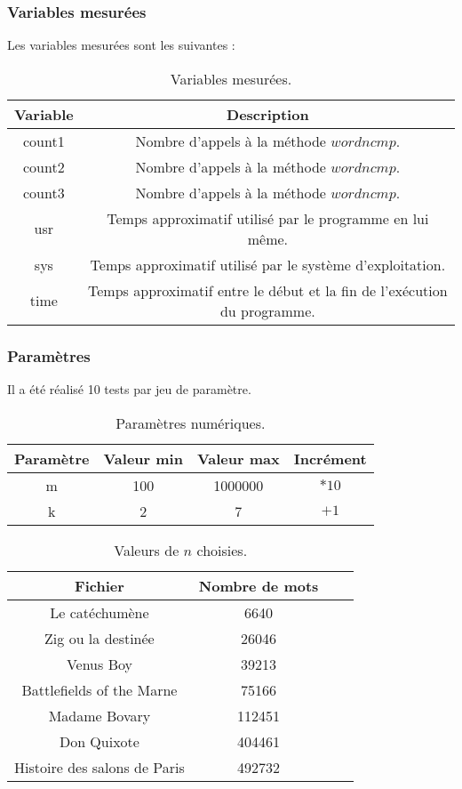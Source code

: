 \subsubsection{Variables mesurées}

Les variables mesurées sont les suivantes :

\begin{table}[h!]
	\centering
	\caption{Variables mesurées.}
	\label{tab:variablesMesureesExperience}
	\begin{tabular}{c|c}
		\toprule
		Variable & Description\\
		\midrule
		count1 & Nombre d'appels à la méthode $wordncmp$.\\
		count2 & Nombre d'appels à la méthode $wordncmp$.\\
		count3 & Nombre d'appels à la méthode $wordncmp$.\\
		usr & Temps approximatif utilisé par le programme en lui même.\\
		sys & Temps approximatif utilisé par le système d'exploitation.\\
		time & Temps approximatif entre le début et la fin de l'exécution du programme.\\
		\bottomrule
	\end{tabular}
\end{table}

\subsubsection{Paramètres}
Il a été réalisé 10 tests par jeu de paramètre.

\begin{table}[h!]
	\centering
	\caption{Paramètres numériques.}
	\label{tab:parametresNumeriquesRealisee}
	\begin{tabular}{c|ccc}
		\toprule
		Paramètre & Valeur min & Valeur max & Incrément\\
		\midrule
		m & 100 & 1000000 & $*10$\\
		k & 2 & 7 & $+1$\\
		\bottomrule
	\end{tabular}
\end{table}

\begin{table}[h!]
	\centering
	\caption{Valeurs de $n$ choisies.}
	\label{tab:valeursDeNChoisiesRealisee}
	\begin{tabular}{c|ccc}
		\toprule
		Fichier & Nombre de mots\\
		\midrule
		Le catéchumène & 6640\\
		Zig ou la destinée & 26046\\
		Venus Boy & 39213\\
		Battlefields of the Marne & 75166\\
		Madame Bovary & 112451\\
		Don Quixote & 404461\\
		Histoire des salons de Paris & 492732\\
		\bottomrule
	\end{tabular}
\end{table}


